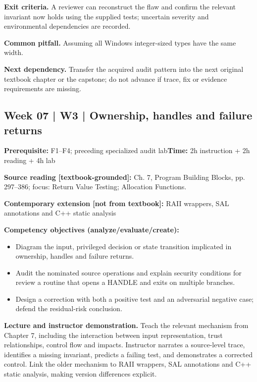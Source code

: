 \documentclass[10pt,letterpaper]{article}
\begin{document}
\textbf{Exit criteria.} A reviewer can reconstruct the flaw and confirm the relevant invariant now holds using the supplied tests; uncertain severity and environmental dependencies are recorded.

\textbf{Common pitfall.} Assuming all Windows integer-sized types have the same width.

\textbf{Next dependency.} Transfer the acquired audit pattern into the next original textbook chapter or the capstone; do not advance if trace, fix or evidence requirements are missing.

\subsection{Week 07 | W3 | Ownership, handles and failure returns}
\textbf{Prerequisite:} F1--F4; preceding specialized audit lab\hfill\textbf{Time:} 2h instruction + 2h reading + 4h lab

\textbf{Source reading [textbook-grounded]:} Ch. 7, Program Building Blocks, pp. 297--386; focus: Return Value Testing; Allocation Functions.

\textbf{Contemporary extension [not from textbook]:} RAII wrappers, SAL annotations and C++ static analysis

\textbf{Competency objectives (analyze/evaluate/create):}
\begin{itemize}[leftmargin=*,itemsep=2pt]
\item Diagram the input, privileged decision or state transition implicated in ownership, handles and failure returns.
\item Audit the nominated source operations and explain security conditions for review a routine that opens a HANDLE and exits on multiple branches.
\item Design a correction with both a positive test and an adversarial negative case; defend the residual-risk conclusion.
\end{itemize}
\textbf{Lecture and instructor demonstration.} Teach the relevant mechanism from Chapter 7, including the interaction between input representation, trust relationships, control flow and impacts. Instructor narrates a source-level trace, identifies a missing invariant, predicts a failing test, and demonstrates a corrected control. Link the older mechanism to RAII wrappers, SAL annotations and C++ static analysis, making version differences explicit.
\end{document}
